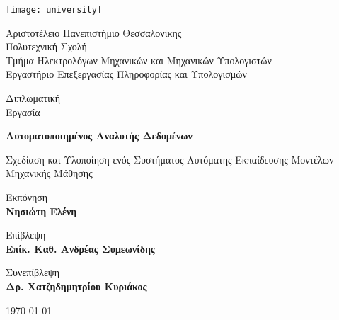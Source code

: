 \begin{titlepage}
			\begin{minipage}{0.3\textwidth}
				\begin{flushright}
				\texttt{[image: university]}
			\end{flushright}
			\end{minipage} \quad
		\begin{minipage}{0.7\textwidth}
				\small
				Αριστοτέλειο Πανεπιστήμιο Θεσσαλονίκης\\
				Πολυτεχνική Σχολή\\
				Τμήμα Ηλεκτρολόγων Μηχανικών και Μηχανικών Υπολογιστών\\
				Εργαστήριο Επεξεργασίας Πληροφορίας και Υπολογισμών\\
		\end{minipage}
	\begin{center}	

			
		\vspace{1.5cm}
		
		\LARGE
		Διπλωματική\\
		Εργασία		
		\vspace{0.3cm}
		
		\Huge
		\textbf{Αυτοματοποιημένος Αναλυτής Δεδομένων}
		
		\vspace{0.3cm}
		\LARGE
		Σχεδίαση και Υλοποίηση ενός Συστήματος Αυτόματης Εκπαίδευσης Μοντέλων Μηχανικής Μάθησης
		
		\vspace{1.5cm}
		
		Εκπόνηση \\
		\textbf{Νησιώτη Ελένη}
		
		\vspace{1.5cm}
		
		Επίβλεψη \\
		\textbf{Επίκ. Καθ. Ανδρέας Συμεωνίδης}
		
		Συνεπίβλεψη \\
		\textbf{Δρ. Χατζηδημητρίου Κυριάκος}
		
		\vspace{1cm}
					
		\today

		
	\end{center}
\end{titlepage}

